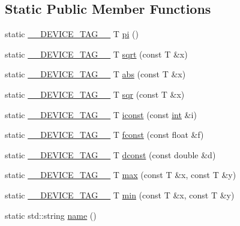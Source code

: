 \subsection*{Static Public Member Functions}
\begin{DoxyCompactItemize}
\item 
static \hyperlink{scalar__traits_8h_a2396f3e69fc9792ad01b8b14a1a425e3}{\-\_\-\-\_\-\-D\-E\-V\-I\-C\-E\-\_\-\-T\-A\-G\-\_\-\-\_\-} T \hyperlink{structscalar__traits_a2b49ff31f10c4146f16c13bf9d7d2e2c}{pi} ()
\item 
static \hyperlink{scalar__traits_8h_a2396f3e69fc9792ad01b8b14a1a425e3}{\-\_\-\-\_\-\-D\-E\-V\-I\-C\-E\-\_\-\-T\-A\-G\-\_\-\-\_\-} T \hyperlink{structscalar__traits_a35fea0f2afb3a5ea4342f1531b99497b}{sqrt} (const T \&x)
\item 
static \hyperlink{scalar__traits_8h_a2396f3e69fc9792ad01b8b14a1a425e3}{\-\_\-\-\_\-\-D\-E\-V\-I\-C\-E\-\_\-\-T\-A\-G\-\_\-\-\_\-} T \hyperlink{structscalar__traits_a07a7fd97a6f44be32582f1ff43e86ee8}{abs} (const T \&x)
\item 
static \hyperlink{scalar__traits_8h_a2396f3e69fc9792ad01b8b14a1a425e3}{\-\_\-\-\_\-\-D\-E\-V\-I\-C\-E\-\_\-\-T\-A\-G\-\_\-\-\_\-} T \hyperlink{structscalar__traits_a1a1b2666ae47d3b6000bc5741c1186fe}{sqr} (const T \&x)
\item 
static \hyperlink{scalar__traits_8h_a2396f3e69fc9792ad01b8b14a1a425e3}{\-\_\-\-\_\-\-D\-E\-V\-I\-C\-E\-\_\-\-T\-A\-G\-\_\-\-\_\-} T \hyperlink{structscalar__traits_a9234b85fb87ffbb30e477232850e9a1d}{iconst} (const \hyperlink{classint}{int} \&i)
\item 
static \hyperlink{scalar__traits_8h_a2396f3e69fc9792ad01b8b14a1a425e3}{\-\_\-\-\_\-\-D\-E\-V\-I\-C\-E\-\_\-\-T\-A\-G\-\_\-\-\_\-} T \hyperlink{structscalar__traits_a0804689345dfe50899b63ae8d66a33d8}{fconst} (const float \&f)
\item 
static \hyperlink{scalar__traits_8h_a2396f3e69fc9792ad01b8b14a1a425e3}{\-\_\-\-\_\-\-D\-E\-V\-I\-C\-E\-\_\-\-T\-A\-G\-\_\-\-\_\-} T \hyperlink{structscalar__traits_a11fc2deb7e600810fb6f29e09dd5393f}{dconst} (const double \&d)
\item 
static \hyperlink{scalar__traits_8h_a2396f3e69fc9792ad01b8b14a1a425e3}{\-\_\-\-\_\-\-D\-E\-V\-I\-C\-E\-\_\-\-T\-A\-G\-\_\-\-\_\-} T \hyperlink{structscalar__traits_a7da8e44b3a3521227a09cacff22edbc8}{max} (const T \&x, const T \&y)
\item 
static \hyperlink{scalar__traits_8h_a2396f3e69fc9792ad01b8b14a1a425e3}{\-\_\-\-\_\-\-D\-E\-V\-I\-C\-E\-\_\-\-T\-A\-G\-\_\-\-\_\-} T \hyperlink{structscalar__traits_ac53dc7b178668efe2dbd410fac29b8cc}{min} (const T \&x, const T \&y)
\item 
static std\-::string \hyperlink{structscalar__traits_ab2bec0da30032faf2015127a28520a41}{name} ()
\end{DoxyCompactItemize}
